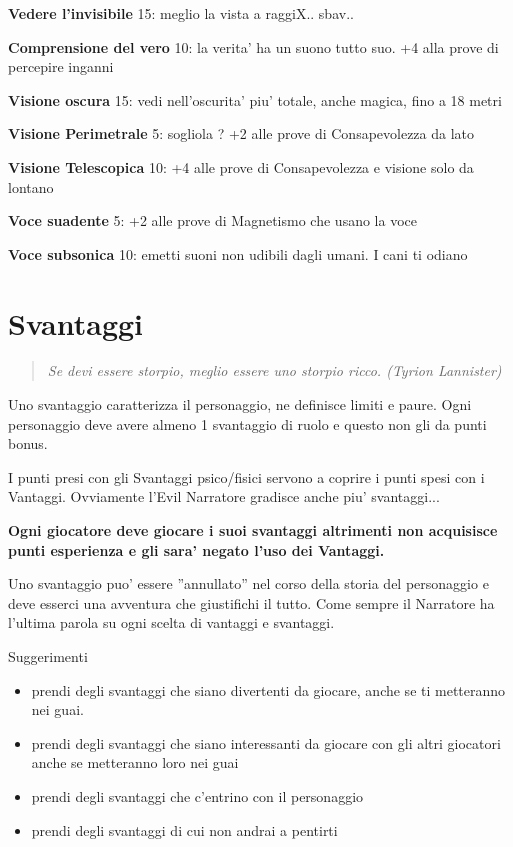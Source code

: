 \documentclass[a4paper,11pt,twoside,openany]{book}
\begin{document}
{		\textbf{Vedere l'invisibile} 15: meglio la vista a raggiX.. sbav..
		
		\textbf{Comprensione del vero} 10: la verita' ha un suono tutto suo. +4 alla prove di percepire inganni
		
		\textbf{Visione oscura} 15: vedi nell'oscurita' piu' totale, anche magica, fino a 18 metri
		
		\textbf{Visione Perimetrale} 5: sogliola ? +2 alle prove di Consapevolezza da lato
		
		\textbf{Visione Telescopica} 10: +4 alle prove di Consapevolezza e visione solo da lontano
		
		\textbf{Voce suadente} 5: +2 alle prove di Magnetismo che usano la voce
		
		\textbf{Voce subsonica} 10: emetti suoni non udibili dagli umani. I cani ti odiano
		
		\pagebreak
		
		\section{Svantaggi}
		
		\label{svantaggi}
		\begin{quote}\textit{
				Se devi essere storpio, meglio essere uno storpio ricco. (Tyrion Lannister)}\end{quote}
		
		Uno svantaggio caratterizza il personaggio, ne definisce limiti e paure. Ogni personaggio deve avere almeno 1 svantaggio di ruolo e questo non gli da punti bonus.
		
		I punti presi con gli Svantaggi psico/fisici servono a coprire i punti spesi con i Vantaggi. Ovviamente l'Evil Narratore gradisce anche piu' svantaggi...
		
		\textbf{Ogni giocatore deve giocare i suoi svantaggi altrimenti non acquisisce punti esperienza e gli sara' negato l'uso dei Vantaggi.}
		
		Uno svantaggio puo' essere ''annullato'' nel corso della storia del personaggio e deve esserci una avventura che giustifichi il tutto. Come sempre il Narratore ha l'ultima parola su ogni scelta di vantaggi e svantaggi.
		
		\bigskip
		
		Suggerimenti
		\begin{itemize}
			\item 
			prendi degli svantaggi che siano divertenti da giocare, anche se ti metteranno nei guai. 
			\item 
			prendi degli svantaggi che siano interessanti da giocare con gli altri giocatori anche se metteranno loro nei guai 
			\item 
			prendi degli svantaggi che c'entrino con il personaggio 
			\item 
			prendi degli svantaggi di cui non andrai a pentirti 
		\end{itemize}
		
}
\end{document}
